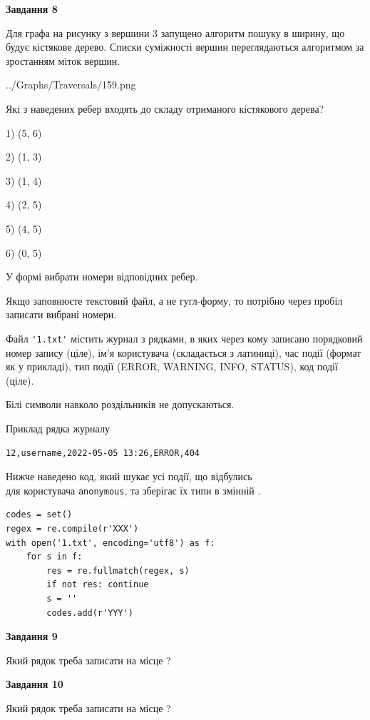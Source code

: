 \documentclass[12pt, ukrainian]{article}
\def\code#1{\Verb!#1!}
\begin{document}
{\begin {large}
{\begin {center}\textbf{Завдання 8}\end {center}}\par
Для графа на рисунку з вершини 3 запущено алгоритм пошуку в ширину, що будує кістякове дерево. Списки суміжності вершин переглядаються алгоритмом за зростанням міток вершин.\par
\begin{center}
	{../Graphs/Traversals/159.png}
\end{center}
\par Які з наведених ребер входять до складу отриманого кістякового дерева?\par
1) (5, 6)\par
2) (1, 3)\par
3) (1, 4)\par
4) (2, 5)\par
5) (4, 5)\par
6) (0, 5)\par
{\vskip 15pt} У формі вибрати номери відповідних ребер.


Якщо заповнюєте текстовий файл, а не гугл-форму, то потрібно через пробіл записа\-ти вибрані номери.\par
\newpage


Файл \code{'1.txt'} містить журнал з рядками, в яких через кому записано поряд\-ко\-вий номер запису (ціле), ім'я користувача (складається з латиниці), час події (фор\-мат як у прикладі), тип події (ERROR, WARNING, INFO, STATUS), код події (ціле).

Білі символи навколо роздільників не допускаються.

Приклад рядка журналу



\begin{verbatim}
12,username,2022-05-05 13:26,ERROR,404
\end{verbatim}


Нижче наведено код, який шукає усі події, що відбулись\\ для користувача \code{anonymous}, та зберігає їх типи в змінній .



\begin{verbatim}
codes = set()
regex = re.compile(r'XXX')
with open('1.txt', encoding='utf8') as f:
    for s in f:
        res = re.fullmatch(regex, s)
        if not res: continue
        s = ''
        codes.add(r'YYY')
\end{verbatim}


{\begin {center}\textbf{Завдання 9}\end {center}}\par
Який рядок треба записати на місце  ?\par
\vspace{5mm}


{\begin {center}\textbf{Завдання 10}\end {center}}\par
Який рядок треба записати на місце  ?\par


\newpage


\end {large}}
\end{document}
